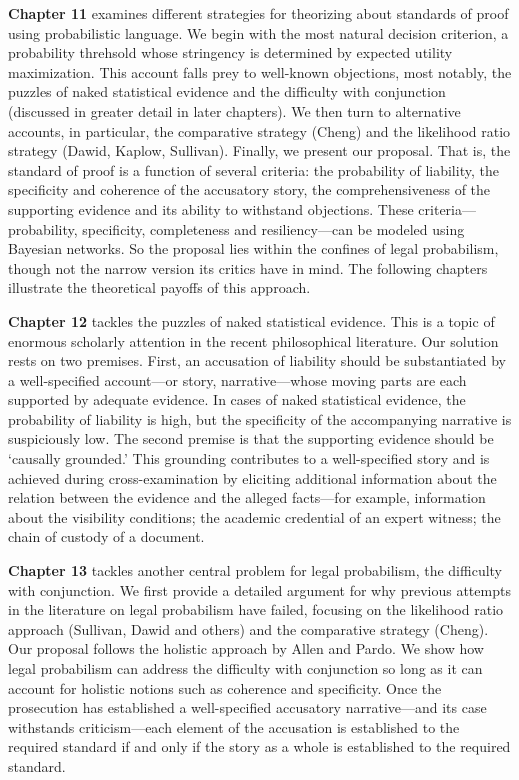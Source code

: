 \documentclass[
  10pt,
  dvipsnames,enabledeprecatedfontcommands]{scrartcl}
\begin{document}
\textbf{Chapter 11} examines different strategies for theorizing about
standards of proof using probabilistic language. We begin with the most
natural decision criterion, a probability threhsold whose stringency is
determined by expected utility maximization. This account falls prey to
well-known objections, most notably, the puzzles of naked statistical
evidence and the difficulty with conjunction (discussed in greater
detail in later chapters). We then turn to alternative accounts, in
particular, the comparative strategy (Cheng) and the likelihood ratio
strategy (Dawid, Kaplow, Sullivan). Finally, we present our proposal.
That is, the standard of proof is a function of several criteria: the
probability of liability, the specificity and coherence of the
accusatory story, the comprehensiveness of the supporting evidence and
its ability to withstand objections. These criteria---probability,
specificity, completeness and resiliency---can be modeled using Bayesian
networks. So the proposal lies within the confines of legal probabilism,
though not the narrow version its critics have in mind. The following
chapters illustrate the theoretical payoffs of this approach.

\textbf{Chapter 12} tackles the puzzles of naked statistical evidence.
This is a topic of enormous scholarly attention in the recent
philosophical literature. Our solution rests on two premises. First, an
accusation of liability should be substantiated by a well-specified
account---or story, narrative---whose moving parts are each supported by
adequate evidence. In cases of naked statistical evidence, the
probability of liability is high, but the specificity of the
accompanying narrative is suspiciously low. The second premise is that
the supporting evidence should be `causally grounded.' This grounding
contributes to a well-specified story and is achieved during
cross-examination by eliciting additional information about the relation
between the evidence and the alleged facts---for example, information
about the visibility conditions; the academic credential of an expert
witness; the chain of custody of a document.

\textbf{Chapter 13} tackles another central problem for legal
probabilism, the difficulty with conjunction. We first provide a
detailed argument for why previous attempts in the literature on legal
probabilism have failed, focusing on the likelihood ratio approach
(Sullivan, Dawid and others) and the comparative strategy (Cheng). Our
proposal follows the holistic approach by Allen and Pardo. We show how
legal probabilism can address the difficulty with conjunction so long as
it can account for holistic notions such as coherence and specificity.
Once the prosecution has established a well-specified accusatory
narrative---and its case withstands criticism---each element of the
accusation is established to the required standard if and only if the
story as a whole is established to the required standard.
\end{document}
